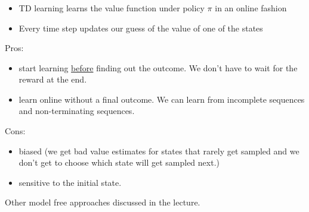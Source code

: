 \begin{frame}\frametitle{\subsubsecname}

\begin{itemize}
\item TD learning learns the value function under policy $\pi$ in an online fashion
\item Every time step updates our guess of the value of one of the states
\end{itemize}

\vspace{10mm}

Pros:
\begin{itemize}
	\item start learning \underline{before} finding out the outcome. We don't have to wait for the reward at the end.
	\item learn online without a final outcome. We can learn from incomplete sequences and non-terminating sequences.
\end{itemize}

Cons:
\pause
\begin{itemize}
	\item biased (we get bad value estimates for states that rarely get sampled and we don't get to choose which state will get sampled next.)
	\item sensitive to the initial state.
\end{itemize}

Other model free approaches discussed in the lecture.%

\end{frame}

